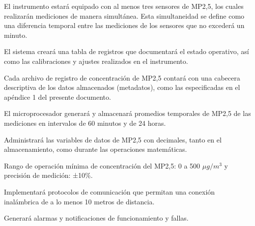 \documentclass[
11pt, %
codirector, %
]{charter}
\makeatletter
\newcommand{\mytwodigits}[1]{\two@digits{#1}}
\newcounter{reqCounter}
\makeatother
\begin{document}
	
\begin{description}
	
	\item[\textbf{[\CODrequerimiento\mytwodigits{\value{reqCounter}}]}] El instrumento estará equipado con al menos tres sensores de MP2,5, los cuales realizarán mediciones de manera simultánea. Esta simultaneidad se define como una diferencia temporal entre las mediciones de los sensores que no excederá un minuto.

	\item[\textbf{[\CODrequerimiento\mytwodigits{\value{reqCounter}}]}] El sistema creará una tabla de registros que documentará el estado operativo, así como las calibraciones y ajustes realizados en el instrumento.
	
	\item[\textbf{[\CODrequerimiento\mytwodigits{\value{reqCounter}}]}] 
	Cada archivo de registro de concentración de MP2,5 contará con una cabecera descriptiva de los datos almacenados (metadatos), como las especificadas en el apéndice 1 del presente documento.
	
	\item[\textbf{[\CODrequerimiento\mytwodigits{\value{reqCounter}}]}] 
	El microprocesador generará y almacenará promedios temporales de MP2,5 de las mediciones en intervalos de 60 minutos y  de 24 horas.
	
	\item[\textbf{[\CODrequerimiento\mytwodigits{\value{reqCounter}}]}] Administrará las variables de datos de MP2,5 con decimales, tanto en el almacenamiento, como durante las operaciones matemáticas.
	
	\item[\textbf{[\CODrequerimiento\mytwodigits{\value{reqCounter}}]}]
	 Rango de operación mínima de concentración del MP2,5: 0 a 500 $\mu g/m^3$ y precisión de medición: ±10\%.
	
	\item[\textbf{[\CODrequerimiento\mytwodigits{\value{reqCounter}}]}] 
	Implementará protocolos de comunicación que permitan una conexión inalámbrica de a lo menos 10 metros de distancia.
	
	\item[\textbf{[\CODrequerimiento\mytwodigits{\value{reqCounter}}]}] 
	Generará alarmas y notificaciones de funcionamiento y fallas.
	

\end{description}
\end{document}
